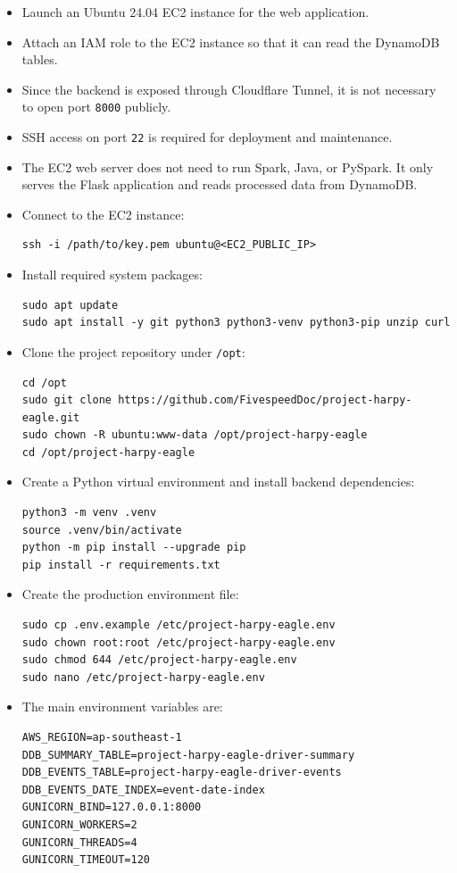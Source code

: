 \documentclass[12pt,a4paper]{article}
\begin{document}
\begin{itemize}
    \item Launch an Ubuntu 24.04 EC2 instance for the web application.
    \item Attach an IAM role to the EC2 instance so that it can read the DynamoDB tables.
    \item Since the backend is exposed through Cloudflare Tunnel, it is not necessary to open port \texttt{8000} publicly.
    \item SSH access on port \texttt{22} is required for deployment and maintenance.
    \item The EC2 web server does not need to run Spark, Java, or PySpark. It only serves the Flask application and reads processed data from DynamoDB.

    \item Connect to the EC2 instance:
\begin{lstlisting}
ssh -i /path/to/key.pem ubuntu@<EC2_PUBLIC_IP>
\end{lstlisting}

    \item Install required system packages:
\begin{lstlisting}
sudo apt update
sudo apt install -y git python3 python3-venv python3-pip unzip curl
\end{lstlisting}

    \item Clone the project repository under \texttt{/opt}:
\begin{lstlisting}
cd /opt
sudo git clone https://github.com/FivespeedDoc/project-harpy-eagle.git
sudo chown -R ubuntu:www-data /opt/project-harpy-eagle
cd /opt/project-harpy-eagle
\end{lstlisting}

    \item Create a Python virtual environment and install backend dependencies:
\begin{lstlisting}
python3 -m venv .venv
source .venv/bin/activate
python -m pip install --upgrade pip
pip install -r requirements.txt
\end{lstlisting}

    \item Create the production environment file:
\begin{lstlisting}
sudo cp .env.example /etc/project-harpy-eagle.env
sudo chown root:root /etc/project-harpy-eagle.env
sudo chmod 644 /etc/project-harpy-eagle.env
sudo nano /etc/project-harpy-eagle.env
\end{lstlisting}

    \item The main environment variables are:
\begin{lstlisting}
AWS_REGION=ap-southeast-1
DDB_SUMMARY_TABLE=project-harpy-eagle-driver-summary
DDB_EVENTS_TABLE=project-harpy-eagle-driver-events
DDB_EVENTS_DATE_INDEX=event-date-index
GUNICORN_BIND=127.0.0.1:8000
GUNICORN_WORKERS=2
GUNICORN_THREADS=4
GUNICORN_TIMEOUT=120
\end{lstlisting}
\end{itemize}
\end{document}
